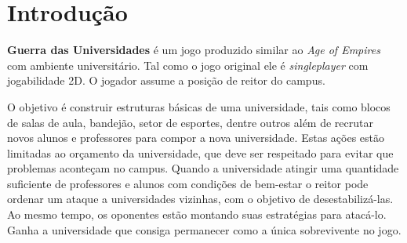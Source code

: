\documentclass[brazil,times]{abnt}
\begin{document}





\data{\today}

\capa

\folhaderosto

\tableofcontents

\chapter{Introdução}

\textbf{Guerra das Universidades} é um jogo produzido similar ao \emph{Age of
Empires} com ambiente universitário. Tal como o jogo original ele é
\emph{singleplayer} com jogabilidade 2D. O jogador assume a posição de reitor do
campus.

O objetivo é construir estruturas básicas de uma universidade, tais como blocos
de salas de aula, bandejão, setor de esportes, dentre outros além de recrutar
novos alunos e professores para compor a nova universidade. Estas ações estão
limitadas ao orçamento da universidade, que deve ser respeitado para evitar que
problemas aconteçam no campus. Quando a universidade atingir uma quantidade
suficiente de professores e alunos com condições de bem-estar o reitor pode
ordenar um ataque a universidades vizinhas, com o objetivo de desestabilizá-las.
Ao mesmo tempo, os oponentes estão montando suas estratégias para atacá-lo.
Ganha a universidade que consiga permanecer como a única sobrevivente no jogo. 
\end{document}

